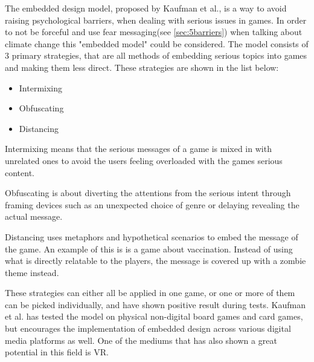    The embedded design model, proposed by Kaufman et al., is a way to avoid raising psychological barriers, when dealing with serious issues in games\cite{embeddedDesignModel}. In order to not be forceful and use fear messaging(see \autoref{sec:5barriers}) when talking about climate change this "embedded model" could be considered\cite{embeddedDesignModel}. The model consists of 3 primary strategies, that are all methods of embedding serious topics into games and making them less direct. These strategies are shown in the list below:
    \begin{itemize}
        \item Intermixing
        \item Obfuscating
        \item Distancing
    \end{itemize}
    
    Intermixing means that the serious messages of a game is mixed in with unrelated ones to avoid the users feeling overloaded with the games serious content\cite{embeddedDesignModel}.
    
    Obfuscating is about diverting the attentions from the serious intent through framing devices such as an unexpected choice of genre or delaying revealing the actual message\cite{embeddedDesignModel}.
    
    Distancing uses metaphors and hypothetical scenarios to embed the message of the game. An example of this is is a game about vaccination. Instead of using what is directly relatable to the players, the message is covered up with a zombie theme instead\cite{embeddedDesignModel}.
    
    These strategies can either all be applied in one game, or one or more of them can be picked individually, and have shown positive result during tests\cite{embeddedDesignModel, embeddedDesignModelTestDetails}. Kaufman et al. has tested the model on physical non-digital board games and card games, but encourages the implementation of embedded design across various digital media platforms as well\cite{embeddedDesignModel}. One of the mediums that has also shown a great potential in this field is VR\cite{persuasiveGameplay, vrCapabilitiesSlater}.
    
